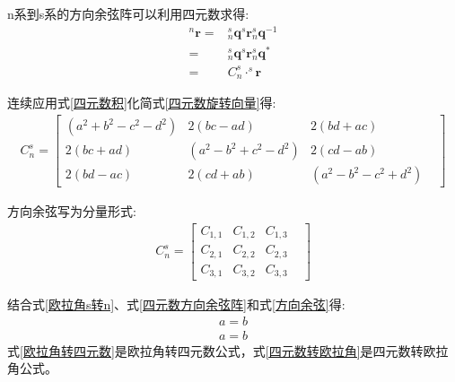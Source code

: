 \documentclass[12pt,a4paper]{article}
\renewcommand{\citep}[1]{\textsuperscript{\cite{#1}}}
\begin{document}
n系到s系的方向余弦阵可以利用四元数\citep{四元数矢量旋转证明1,四元数矢量旋转证明2}求得:
\begin{equation}\label{四元数旋转向量}
    \begin{split} 
        ^n\bm{r} 
        = &^s_n\bm{q} ^s\bm{r} ^s_n\bm{q}^{-1} \\
        = &^s_n\bm{q} ^s\bm{r} ^s_n\bm{q}^{*} \\
        = &C^s_n \cdot ^s\bm{r}
    \end{split}
\end{equation} 

连续应用式\ref{四元数积}化简式\ref{四元数旋转向量}得:
\begin{equation}\label{四元数方向余弦阵}
    \begin{split} 
        C^s_n = \left[\begin{matrix} 
                (a^2+b^2-c^2-d^2) & 2(bc-ad) & 2(bd+ac) & \\
                2(bc+ad) & (a^2-b^2+c^2-d^2) & 2(cd-ab) & \\
                2(bd-ac) & 2(cd+ab) & (a^2-b^2-c^2+d^2) &
        \end{matrix}\right]
    \end{split}
\end{equation} 

方向余弦写为分量形式:
\begin{equation}\label{方向余弦}
    \begin{split} 
        C^s_n = \left[\begin{matrix} 
                C_{1,1} & C_{1,2} & C_{1,3} & \\
                C_{2,1} & C_{2,2} & C_{2,3} & \\
                C_{3,1} & C_{3,2} & C_{3,3} &
        \end{matrix}\right]
    \end{split}
\end{equation} 

结合式\ref{欧拉角s转n}、式\ref{四元数方向余弦阵}和式\ref{方向余弦}得:
\begin{equation}\label{欧拉角转四元数}
    \begin{split} 
        a=b
    \end{split}
\end{equation} 
\begin{equation}\label{四元数转欧拉角}
    \begin{split} 
        a=b
    \end{split}
\end{equation} 
式\ref{欧拉角转四元数}是欧拉角转四元数公式，式\ref{四元数转欧拉角}是四元数转欧拉角公式。
\end{document}
